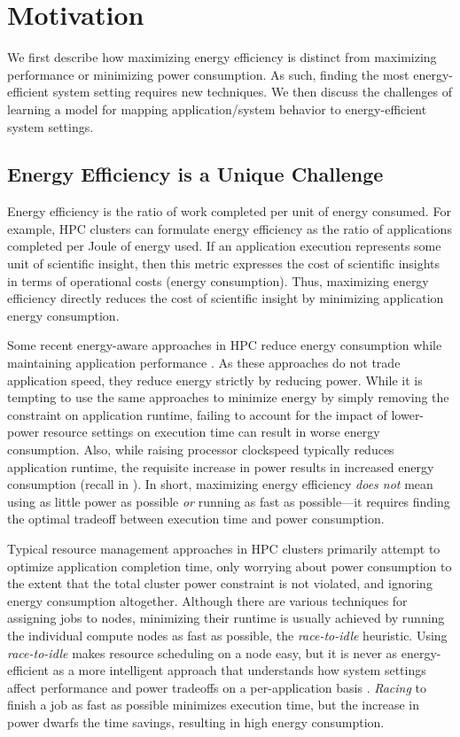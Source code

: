\section{Motivation}
\label{sec:classifiers-motivation}

We first describe how maximizing energy efficiency is distinct from maximizing performance or minimizing power consumption.
As such, finding the most energy-efficient system setting requires new techniques.
We then discuss the challenges of learning a model for mapping application/system behavior to energy-efficient system settings.


\subsection{Energy Efficiency is a Unique Challenge}

Energy efficiency is the ratio of work completed per unit of energy consumed.
For example, HPC clusters can formulate energy efficiency as the ratio of applications completed per Joule of energy used.
If an application execution represents some unit of scientific insight, then this metric expresses the cost of scientific insights in terms of operational costs (energy consumption).
Thus, maximizing energy efficiency directly reduces the cost of scientific insight by minimizing application energy consumption.

Some recent energy-aware approaches in HPC reduce energy consumption while maintaining application performance \cite{Jitter,Marathe2015,RountreeAdagio}.
As these approaches do not trade application speed, they reduce energy strictly by reducing power.
While it is tempting to use the same approaches to minimize energy by simply removing the constraint on application runtime, failing to account for the impact of lower-power resource settings on execution time can result in worse energy consumption.
Also, while raising processor clockspeed typically reduces application runtime, the requisite increase in power results in increased energy consumption (recall  in ).
In short, maximizing energy efficiency \emph{does not} mean using as little power as possible \emph{or} running as fast as possible---it requires finding the optimal tradeoff between execution time and power consumption.


Typical resource management approaches in HPC clusters primarily attempt to optimize application completion time, only worrying about power consumption to the extent that the total cluster power constraint is not violated, and ignoring energy consumption altogether.
Although there are various techniques for assigning jobs to nodes, minimizing their runtime is usually achieved by running the individual compute nodes as fast as possible, \ie the \emph{race-to-idle} heuristic.
Using \emph{race-to-idle} makes resource scheduling on a node easy, but it is never as energy-efficient as a more intelligent approach that understands how system settings affect performance and power tradeoffs on a per-application basis \cite{kim-cpsna2015}.
\emph{Racing} to finish a job as fast as possible minimizes execution time, but the increase in power dwarfs the time savings, resulting in high energy consumption.

